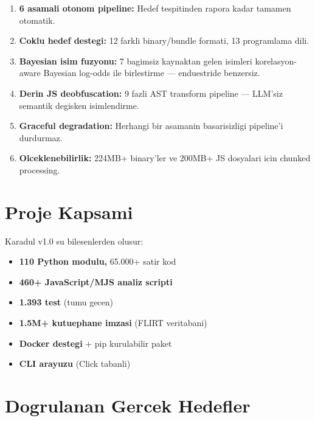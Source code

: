 \documentclass[12pt,a4paper,oneside]{book}
\theoremstyle{definition}
\begin{document}
\begin{enumerate}
\item \textbf{6 asamali otonom pipeline:} Hedef tespitinden rapora kadar tamamen otomatik.
\item \textbf{Coklu hedef destegi:} 12 farkli binary/bundle formati, 13 programlama dili.
\item \textbf{Bayesian isim fuzyonu:} 7 bagimsiz kaynaktan gelen isimleri korelasyon-aware Bayesian log-odds ile birlestirme --- enduestride benzersiz.
\item \textbf{Derin JS deobfuscation:} 9 fazli AST transform pipeline --- LLM'siz semantik degisken isimlendirme.
\item \textbf{Graceful degradation:} Herhangi bir asamanin basarisizligi pipeline'i durdurmaz.
\item \textbf{Olceklenebilirlik:} 224MB+ binary'ler ve 200MB+ JS dosyalari icin chunked processing.
\end{enumerate}

\section{Proje Kapsami}
\label{sec:kapsam}

Karadul v1.0 su bilesenlerden olusur:

\begin{itemize}
\item \textbf{110 Python modulu,} 65.000+ satir kod
\item \textbf{460+ JavaScript/MJS analiz scripti}
\item \textbf{1.393 test} (tumu gecen)
\item \textbf{1.5M+ kutuephane imzasi} (FLIRT veritabani)
\item \textbf{Docker destegi} + pip kurulabilir paket
\item \textbf{CLI arayuzu} (Click tabanli)
\end{itemize}

\section{Dogrulanan Gercek Hedefler}
\end{document}
